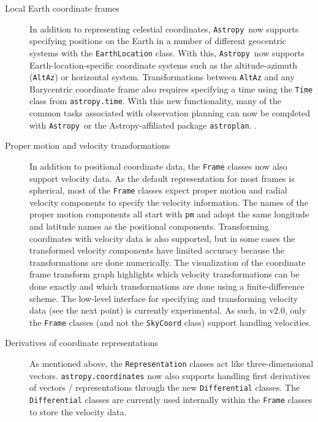 \documentclass[modern]{aastex61}
\newcommand{\package}[1]{\texttt{#1}}
\newcommand{\astropy}{Astropy}
\newcommand{\astropypkg}{\package{Astropy}}
\newcommand{\inlinecomment}[2]{\todo[inline]{#1: #2}}
\begin{document}
\begin{description}
    \item[Local Earth coordinate frames] In addition to representing celestial
    coordinates, \astropypkg\ now supports specifying positions on the Earth in
    a number of different geocentric systems with the \texttt{EarthLocation}
    class.
    With this, \astropypkg\ now supports Earth-location-specific coordinate
    systems such as the altitude-azimuth (\texttt{AltAz}) or horizontal system.
    Transformations between \texttt{AltAz} and any Barycentric coordinate frame
    also requires specifying a time using the \texttt{Time} class from
    \texttt{astropy.time}.
    With this new functionality, many of the common tasks associated with
    observation planning can now be completed with \astropypkg\ or the
    \astropy-affiliated package \package{astroplan}. \inlinecomment{APW}{TODO: cite zenodo entry for astroplan?}.

    \item[Proper motion and velocity transformations]
    In addition to positional coordinate data, the \texttt{Frame} classes now
    also support velocity data.
    As the default representation for most frames is spherical, most of the
    \texttt{Frame} classes expect proper motion and radial velocity components
    to specify the velocity information.
    The names of the proper motion components all start with \texttt{pm} and
    adopt the same longitude and latitude names as the positional components.
    Transforming coordinates with velocity data is also supported, but in some
    cases the transformed velocity components have limited accuracy because the
    transformations are done numerically.
    The visualization of the coordinate frame transform graph highlights which
    velocity transformations can be done exactly and which transformations are
    done using a finite-difference scheme.
    The low-level interface for specifying and transforming velocity data (see
    the next point) is currently experimental.
    As such, in v2.0, only the \texttt{Frame} classes (and not the
    \texttt{SkyCoord} class) support handling velocities.

    \item[Derivatives of coordinate representations]
    As mentioned above, the \texttt{Representation} classes act like
    three-dimensional vectors.
    \texttt{astropy.coordinates} now also supports handling first derivatives of
    vectors / representations through the new \texttt{Differential} classes.
    The \texttt{Differential} classes are currently used internally within the
    \texttt{Frame} classes to store the velocity data.


\end{description}
\end{document}
